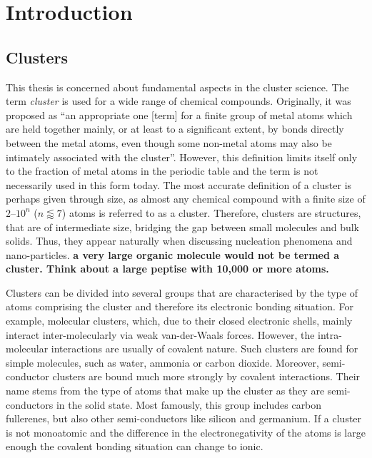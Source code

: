 
\part{Introduction}
\label{sec:introduction}

%
\chapter{Clusters}
\label{sec:clusters}

This thesis is concerned about fundamental aspects in the cluster science.
The term \emph{cluster} is used for a wide range of chemical compounds.
Originally, it was proposed as ``an appropriate one [term] for a finite group of
metal atoms which are held together mainly, or at least to a significant extent,
by bonds directly between the metal atoms, even though some non-metal atoms may
also be intimately associated with the
cluster''.\autocite{Cotton_MetalAtomClusters_1964} However, this definition
limits itself only to the fraction of metal atoms in the periodic table and the
term is not necessarily used in this form today. The most accurate definition of
a cluster is perhaps given through size, as almost any chemical compound with a
finite size of $2$--$10^n$ ($n\lessapprox 7$) atoms is referred to as a
cluster.\autocite{Johnston_Atomicmolecularclusters_2002,Wales_Energylandscapes_2003}
Therefore, clusters are structures, that are of intermediate size, bridging the
gap between small molecules and bulk solids. Thus, they appear naturally when
discussing nucleation phenomena and nano-particles. \textbf{ a very large organic
molecule would not be termed a cluster. Think about a large peptise with 10,000 or more atoms.}

Clusters can be divided into several groups that are characterised by the type
of atoms comprising the cluster and therefore its electronic bonding situation.
For example, molecular clusters, which, due to their closed electronic shells,
mainly interact inter-molecularly via weak van-der-Waals forces. However, the
intra-molecular interactions are usually of covalent nature. Such clusters are
found for simple molecules, such as water,\autocite{Liu_WaterClusters_1996}
ammonia\autocite{Beu_Structureammoniaclusters_2001} or carbon
dioxide.\autocite{Takeuchi_GeometryOptimizationCarbon_2008} Moreover,
semi-conductor clusters are bound much more strongly by covalent interactions.
Their name stems from the type of atoms that make up the cluster as they are
semi-conductors in the solid state. Most famously, this group includes carbon
fullerenes\autocite{Kroto_stabilityfullerenesCn_1987}, but also other
semi-conductors like silicon\autocite{Zhu_Structuresstabilitiessmall_2003a} and
germanium.\autocite{Pacchioni_Silicongermaniumclusters_1986} If a cluster is not
monoatomic and the difference in the electronegativity of the atoms is large
enough the covalent bonding situation can change to ionic.

